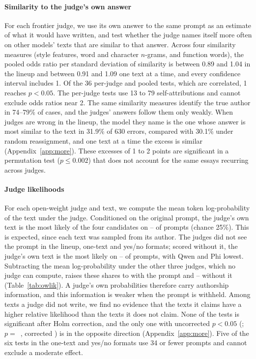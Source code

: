 \paragraph{Similarity to the judge's own answer}
For each frontier judge, we use its own answer to the same prompt as an
estimate of what it would have written, and test whether the judge names itself
more often on other models' texts that are similar to that answer. Across four
similarity measures (style features, word and character $n$-grams, and
function words), the pooled odds ratio per standard deviation of similarity is
between 0.89 and 1.04 in the lineup and between 0.91 and 1.09 one text at a
time, and every confidence interval includes 1. Of the 36 per-judge and pooled
tests, which are correlated, 1 reaches $p<0.05$. The per-judge tests use 13 to
79 self-attributions and cannot exclude odds ratios near 2. The same similarity
measures identify the true author in 74--79\% of cases, and the judges' answers
follow them only weakly. When judges are wrong in the lineup, the model they
name is the one whose answer is most similar to the text in 31.9\% of 630
errors, compared with 30.1\% under random reassignment, and one text at a time
the excess is similar (Appendix~\ref{app:more}). These excesses of 1 to 2
points are significant in a permutation test ($p\le 0.002$) that does not
account for the same essays recurring across judges.

\paragraph{Judge likelihoods}
For each open-weight judge and text, we compute the mean token log-probability
of the text under the judge. Conditioned on the original prompt, the judge's
own text is the most likely of the four candidates on
\OWLikCondRawMin{}--\OWLikCondRawMax{} of prompts (chance 25\%). This is
expected, since each text was sampled from its author. The judges did not see
the prompt in the lineup, one-text and yes/no formats; scored without it, the
judge's own text is the most likely on \OWLikUncRawMin{}--\OWLikUncRawMax{} of
prompts, with Qwen and Phi lowest. Subtracting the mean log-probability under
the other three judges, which no judge can compute, raises these shares to
\OWLikCondAccMin{} with the prompt and \OWLikUncAccMin{}--\OWLikUncAccMax{}
without it (Table~\ref{tab:owlik}). A judge's own probabilities therefore carry
authorship information, and this information is weaker when the prompt is
withheld. Among texts a judge did not write, we find no evidence that the texts
it claims have a higher relative likelihood than the texts it does not claim.
None of the \OWFamTests{} tests is significant after Holm correction, and the
only one with uncorrected $p<0.05$ (\OWFamMinWho{}; $p=$~\OWFamMinP{},
corrected \OWFamMinHolm{}) is in the opposite direction
(Appendix~\ref{app:more}). Five of the six tests in the one-text and yes/no
formats use 34 or fewer prompts and cannot exclude a moderate effect.


